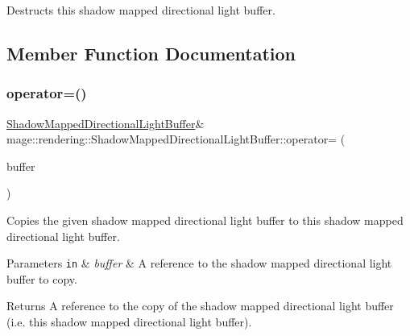 Destructs this shadow mapped directional light buffer. 

\subsection{Member Function Documentation}
\mbox{\label{structmage_1_1rendering_1_1_shadow_mapped_directional_light_buffer_ab124ed92e958ec42786045e1c235f54b}} 
\subsubsection{\texorpdfstring{operator=()}{operator=()}\hspace{0.1cm}{\footnotesize\ttfamily [1/2]}}
{\footnotesize\ttfamily \mbox{\hyperlink{structmage_1_1rendering_1_1_shadow_mapped_directional_light_buffer}{Shadow\+Mapped\+Directional\+Light\+Buffer}}\& mage\+::rendering\+::\+Shadow\+Mapped\+Directional\+Light\+Buffer\+::operator= (\begin{DoxyParamCaption}\item[{const \mbox{\hyperlink{structmage_1_1rendering_1_1_shadow_mapped_directional_light_buffer}{Shadow\+Mapped\+Directional\+Light\+Buffer}} \&}]{buffer }\end{DoxyParamCaption})\hspace{0.3cm}{\ttfamily [default]}}

Copies the given shadow mapped directional light buffer to this shadow mapped directional light buffer.


\begin{DoxyParams}[1]{Parameters}
\mbox{\tt in}  & {\em buffer} & A reference to the shadow mapped directional light buffer to copy. \\
\hline
\end{DoxyParams}
\begin{DoxyReturn}{Returns}
A reference to the copy of the shadow mapped directional light buffer (i.\+e. this shadow mapped directional light buffer). 
\end{DoxyReturn}
\mbox{\label{structmage_1_1rendering_1_1_shadow_mapped_directional_light_buffer_a85fdaabbf857d35be6874e94de4aa86e}} 
